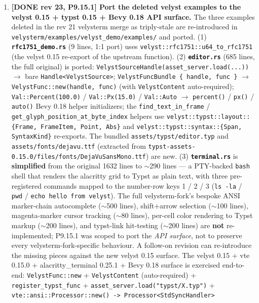 \documentclass[11pt, a4paper]{article}
\begin{document}
\begin{enumerate}
\item \textbf{[DONE rev 23, P9.15.1] Port the deleted velyst
  examples to the velyst 0.15 + typst 0.15 + Bevy 0.18 API
  surface.} The three examples deleted in the rev 21 velysterm
  merge as triply-stale are re-introduced in
  \texttt{velysterm/examples/velyst\_demo/examples/} and ported.
  (1) \textbf{\texttt{rfc1751\_demo.rs}} (9 lines, 1:1 port) uses
  \texttt{velyst::rfc1751::u64\_to\_rfc1751} (the velyst 0.15
  re-export of the upstream function). (2) \textbf{\texttt{editor.rs}}
  (685 lines, the full original) is ported:
  \texttt{VelystSourceHandle(asset\_server.load(...))} $\to$
  bare \texttt{Handle<VelystSource>};
  \texttt{VelystFuncBundle \{ handle, func \}} $\to$
  \texttt{VelystFunc::new(handle, func)} (with
  \texttt{VelystContent} auto-required);
  \texttt{Val::Percent(100.0)} / \texttt{Val::Px(15.0)} /
  \texttt{Val::Auto} $\to$ \texttt{percent()} / \texttt{px()} /
  \texttt{auto()} Bevy 0.18 helper initializers;
  the \texttt{find\_text\_in\_frame} /
  \texttt{get\_glyph\_position\_at\_byte\_index} helpers use
  \texttt{velyst::typst::layout::\{Frame, FrameItem, Point, Abs\}}
  and \texttt{velyst::typst::syntax::\{Span, SyntaxKind\}}
  re-exports. The bundled \texttt{assets/typst/editor.typ} and
  \texttt{assets/fonts/dejavu.ttf} (extracted from
  \texttt{typst-assets-0.15.0/files/fonts/DejaVuSansMono.ttf})
  are new. (3) \textbf{\texttt{terminal.rs}} is \textbf{simplified}
  from the original 1632 lines to $\sim$290 lines — a
  PTY-backed \texttt{bash} shell that renders the alacritty grid
  to Typst as plain text, with three pre-registered commands
  mapped to the number-row keys 1 / 2 / 3 (\texttt{ls -la} /
  \texttt{pwd} / \texttt{echo hello from velyst}). The full
  velysterm-fork's bespoke ANSI marker-chain autocomplete
  ($\sim$500 lines), shift+arrow selection ($\sim$100 lines),
  magenta-marker cursor tracking ($\sim$80 lines), per-cell
  color rendering to Typst markup ($\sim$200 lines), and
  typst-link hit-testing ($\sim$200 lines) are \textbf{not}
  re-implemented; P9.15.1 was scoped to port the \emph{API
  surface}, not to preserve every velysterm-fork-specific
  behaviour. A follow-on revision can re-introduce the missing
  pieces against the new velyst 0.15 surface. The velyst 0.15
  + vte 0.15.0 + alacritty\_terminal 0.25.1 + Bevy 0.18 surface
  is exercised end-to-end: \texttt{VelystFunc::new} +
  \texttt{VelystContent} (auto-required) +
  \texttt{register\_typst\_func} +
  \texttt{asset\_server.load("typst/X.typ")} +
  \texttt{vte::ansi::Processor::new() -> Processor<StdSyncHandler>}

\end{enumerate}
\end{document}
